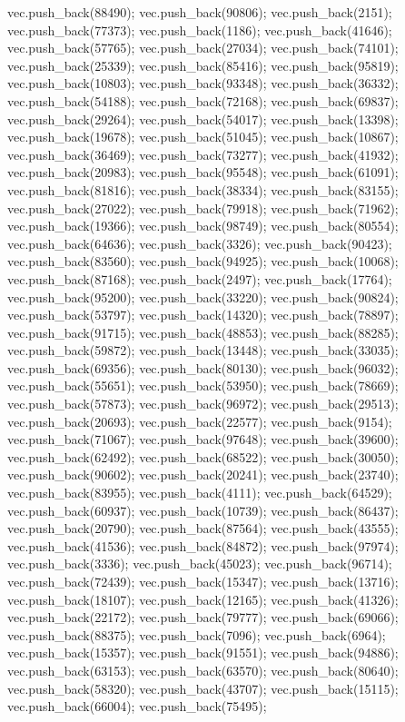 vec.push_back(88490);
vec.push_back(90806);
vec.push_back(2151);
vec.push_back(77373);
vec.push_back(1186);
vec.push_back(41646);
vec.push_back(57765);
vec.push_back(27034);
vec.push_back(74101);
vec.push_back(25339);
vec.push_back(85416);
vec.push_back(95819);
vec.push_back(10803);
vec.push_back(93348);
vec.push_back(36332);
vec.push_back(54188);
vec.push_back(72168);
vec.push_back(69837);
vec.push_back(29264);
vec.push_back(54017);
vec.push_back(13398);
vec.push_back(19678);
vec.push_back(51045);
vec.push_back(10867);
vec.push_back(36469);
vec.push_back(73277);
vec.push_back(41932);
vec.push_back(20983);
vec.push_back(95548);
vec.push_back(61091);
vec.push_back(81816);
vec.push_back(38334);
vec.push_back(83155);
vec.push_back(27022);
vec.push_back(79918);
vec.push_back(71962);
vec.push_back(19366);
vec.push_back(98749);
vec.push_back(80554);
vec.push_back(64636);
vec.push_back(3326);
vec.push_back(90423);
vec.push_back(83560);
vec.push_back(94925);
vec.push_back(10068);
vec.push_back(87168);
vec.push_back(2497);
vec.push_back(17764);
vec.push_back(95200);
vec.push_back(33220);
vec.push_back(90824);
vec.push_back(53797);
vec.push_back(14320);
vec.push_back(78897);
vec.push_back(91715);
vec.push_back(48853);
vec.push_back(88285);
vec.push_back(59872);
vec.push_back(13448);
vec.push_back(33035);
vec.push_back(69356);
vec.push_back(80130);
vec.push_back(96032);
vec.push_back(55651);
vec.push_back(53950);
vec.push_back(78669);
vec.push_back(57873);
vec.push_back(96972);
vec.push_back(29513);
vec.push_back(20693);
vec.push_back(22577);
vec.push_back(9154);
vec.push_back(71067);
vec.push_back(97648);
vec.push_back(39600);
vec.push_back(62492);
vec.push_back(68522);
vec.push_back(30050);
vec.push_back(90602);
vec.push_back(20241);
vec.push_back(23740);
vec.push_back(83955);
vec.push_back(4111);
vec.push_back(64529);
vec.push_back(60937);
vec.push_back(10739);
vec.push_back(86437);
vec.push_back(20790);
vec.push_back(87564);
vec.push_back(43555);
vec.push_back(41536);
vec.push_back(84872);
vec.push_back(97974);
vec.push_back(3336);
vec.push_back(45023);
vec.push_back(96714);
vec.push_back(72439);
vec.push_back(15347);
vec.push_back(13716);
vec.push_back(18107);
vec.push_back(12165);
vec.push_back(41326);
vec.push_back(22172);
vec.push_back(79777);
vec.push_back(69066);
vec.push_back(88375);
vec.push_back(7096);
vec.push_back(6964);
vec.push_back(15357);
vec.push_back(91551);
vec.push_back(94886);
vec.push_back(63153);
vec.push_back(63570);
vec.push_back(80640);
vec.push_back(58320);
vec.push_back(43707);
vec.push_back(15115);
vec.push_back(66004);
vec.push_back(75495);
